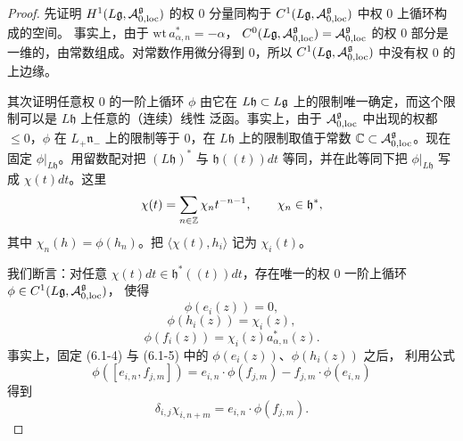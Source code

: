 \begin{proof}
    先证明 $H^1(L\mathfrak{g},\mathcal{A}^{\mathfrak g}_{0,\mathrm{loc}})$ 的权 $0$ 分量同构于
    $C^1(L\mathfrak{g},\mathcal{A}^{\mathfrak g}_{0,\mathrm{loc}})$ 中权 $0$ 上循环构成的空间。
    事实上，由于 $\mathrm{wt}\,a^*_{\alpha,n}=-\alpha$，
    $C^0(L\mathfrak{g},\mathcal{A}^{\mathfrak g}_{0,\mathrm{loc}})=\mathcal{A}^{\mathfrak g}_{0,\mathrm{loc}}$
    的权 $0$ 部分是一维的，由常数组成。对常数作用微分得到 $0$，所以
    $C^1(L\mathfrak{g},\mathcal{A}^{\mathfrak g}_{0,\mathrm{loc}})$ 中没有权 $0$ 的上边缘。

    其次证明任意权 $0$ 的一阶上循环 $\phi$ 由它在 $L\mathfrak h\subset L\mathfrak{g}$
    上的限制唯一确定，而这个限制可以是 $L\mathfrak h$ 上任意的（连续）线性
    泛函。事实上，由于 $\mathcal{A}^{\mathfrak g}_{0,\mathrm{loc}}$ 中出现的权都
    $\le0$，$\phi$ 在 $L_+\mathfrak n_-$ 上的限制等于 $0$，在 $L\mathfrak h$
    上的限制取值于常数 $\mathbb{C}\subset\mathcal{A}^{\mathfrak g}_{0,\mathrm{loc}}$。现在固定
    $\phi|_{L\mathfrak h}$。用留数配对把 $(L\mathfrak h)^*$ 与
    $\mathfrak h(\!(t)\!)dt$ 等同，并在此等同下把 $\phi|_{L\mathfrak h}$ 写成
    $\chi(t)dt$。这里
    \[
        \chi(t)=\sum_{n\in\mathbb{Z}}\chi_nt^{-n-1},\qquad\chi_n\in\mathfrak h^*,
    \]
    其中 $\chi_n(h)=\phi(h_n)$。把 $\langle\chi(t),h_i\rangle$ 记为
    $\chi_i(t)$。

    我们断言：对任意 $\chi(t)dt\in\mathfrak h^*(\!(t)\!)dt$，存在唯一的权
    $0$ 一阶上循环 $\phi\in C^1(L\mathfrak{g},\mathcal{A}^{\mathfrak g}_{0,\mathrm{loc}})$，
    使得
    \begin{equation}
        \phi(e_i(z))=0,
        \tag{6.1-4}
    \end{equation}
    \begin{equation}
        \phi(h_i(z))=\chi_i(z),
        \tag{6.1-5}
    \end{equation}
    \begin{equation}
        \phi(f_i(z))=\chi_i(z)a^*_{\alpha,n}(z).
        \tag{6.1-6}
    \end{equation}
    事实上，固定 (6.1-4) 与 (6.1-5) 中的 $\phi(e_i(z))$、$\phi(h_i(z))$ 之后，
    利用公式
    \[
        \phi([e_{i,n},f_{j,m}])=e_{i,n}\cdot\phi(f_{j,m})
        -f_{j,m}\cdot\phi(e_{i,n})
    \]
    得到
    \[
        \delta_{i,j}\chi_{i,n+m}=e_{i,n}\cdot\phi(f_{j,m}).
    \]
\end{proof}

